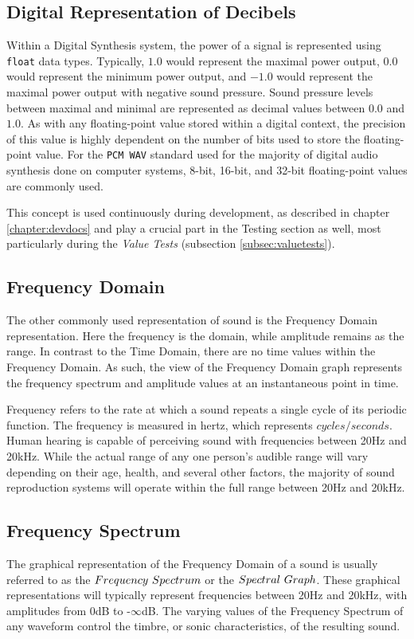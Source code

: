\documentclass[a4paper,12pt]{report}
\begin{document}
\subsection{Digital Representation of Decibels}
\label{subsec:digitalrepdecibels}
Within a Digital Synthesis system, the power of a signal is represented using \texttt{float} data types. Typically, $1.0$ would represent the maximal power output, $0.0$ would represent the minimum power output, and $-1.0$ would represent the maximal power output with negative sound pressure. Sound pressure levels between maximal and minimal are represented as decimal values between $0.0$ and $1.0$. As with any floating-point value stored within a digital context, the precision of this value is highly dependent on the number of bits used to store the floating-point value. For the \texttt{PCM\ \-WAV} standard used for the majority of digital audio synthesis done on computer systems, 8-bit, 16-bit, and 32-bit floating-point values are commonly used.

This concept is used continuously during development, as described in chapter \ref{chapter:devdocs} and play a crucial part in the Testing section as well, most particularly during the \emph{Value Tests} (subsection \ref{subsec:valuetests}).

\subsection{Frequency Domain}
\label{subsec:freqdomain}
The other commonly used representation of sound is the Frequency Domain representation. Here the frequency is the domain, while amplitude remains as the range. In contrast to the Time Domain, there are no time values within the Frequency Domain. As such, the view of the Frequency Domain graph represents the frequency spectrum and amplitude values at an instantaneous point in time.

Frequency refers to the rate at which a sound repeats a single cycle of its periodic function. The frequency is measured in hertz, which represents $cycles/seconds$. Human hearing is capable of perceiving sound with frequencies between 20Hz and 20kHz. While the actual range of any one person's audible range will vary depending on their age, health, and several other factors, the majority of sound reproduction systems will operate within the full range between 20Hz and 20kHz. 

\subsection{Frequency Spectrum}
\label{subsec:freqspect}
The graphical representation of the Frequency Domain of a sound is usually referred to as the $Frequency\ \-Spectrum$ or the $Spectral\ \-Graph$. These graphical representations will typically represent frequencies between 20Hz and 20kHz, with amplitudes from 0dB to -$\infty$dB. The varying values of the Frequency Spectrum of any waveform control the timbre, or sonic characteristics, of the resulting sound.
\end{document}
